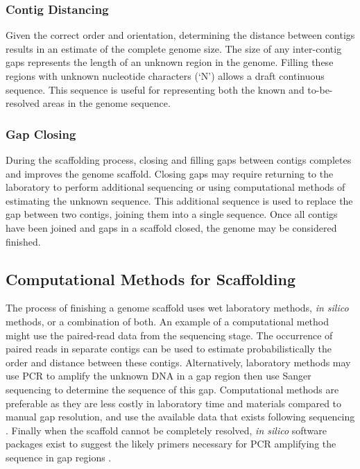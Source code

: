 \documentclass[10pt]{bmc_article}
\newenvironment{bmcformat}{\begin{raggedright}\baselineskip20pt\sloppy\setboolean{publ}{false}}{\end{raggedright}\baselineskip20pt\sloppy}
\begin{document}
\begin{bmcformat}
\subsubsection*{Contig Distancing} %

Given the correct order and orientation, determining the distance between
contigs results in an estimate of the complete genome size. The size of any
inter-contig gaps represents the length of an unknown region in the genome.
Filling these regions with unknown nucleotide characters (`N') allows a draft
continuous sequence. This sequence is useful for representing both the known
and to-be-resolved areas in the genome sequence.

\subsubsection*{Gap Closing} %

During the scaffolding process, closing and filling gaps between contigs
completes and improves the genome scaffold. Closing gaps may require returning
to the laboratory to perform additional sequencing or using computational
methods of estimating the unknown sequence. This additional sequence is used
to replace the gap between two contigs, joining them into a single sequence.
Once all contigs have been joined and gaps in a scaffold closed, the genome
may be considered finished.

\subsection*{Computational Methods for Scaffolding} %

The process of finishing a genome scaffold uses wet laboratory methods,
\emph{in silico} methods, or a combination of both. An example of a
computational method might use the paired-read data from the sequencing stage.
The occurrence of paired reads in separate contigs can be used to estimate
probabilistically the order and distance between these contigs. Alternatively,
laboratory methods may use PCR to amplify the unknown DNA in a gap region then
use Sanger sequencing to determine the sequence of this gap. Computational
methods are preferable as they are less costly in laboratory time and materials
compared to manual gap resolution, and use the available data that exists
following sequencing \cite{nagarajan2010}. Finally when the scaffold cannot be
completely resolved, \emph{in silico} software packages exist to suggest the
likely primers necessary for PCR amplifying the sequence in gap regions
\cite{gordon2001}. \pb


\end{bmcformat}
\end{document}
